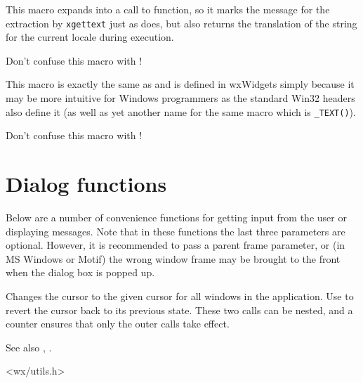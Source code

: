 
This macro expands into a call to  
function, so it marks the message for the extraction by {\tt xgettext} just as
 does, but also returns the translation of
the string for the current locale during execution.

Don't confuse this macro with !


\label{underscoret}



This macro is exactly the same as  and is defined in
wxWidgets simply because it may be more intuitive for Windows programmers as
the standard Win32 headers also define it (as well as yet another name for the
same macro which is {\tt \_TEXT()}).

Don't confuse this macro with !



\section{Dialog functions}\label{dialogfunctions}

Below are a number of convenience functions for getting input from the
user or displaying messages. Note that in these functions the last three
parameters are optional. However, it is recommended to pass a parent frame
parameter, or (in MS Windows or Motif) the wrong window frame may be brought to
the front when the dialog box is popped up.


\label{wxbeginbusycursor}


Changes the cursor to the given cursor for all windows in the application.
Use  to revert the cursor back
to its previous state. These two calls can be nested, and a counter
ensures that only the outer calls take effect.

See also , .


<wx/utils.h>


